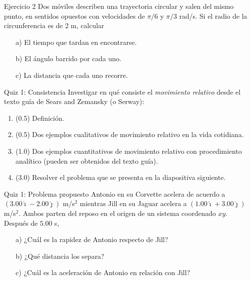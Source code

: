 \begin{frame}{Ejercicio 2}
    Dos móviles describen una trayectoria circular y salen del mismo punto, en sentidos opuestos con velocidades de $\pi/6$ y $\pi/3$ rad/s. Si el radio de la circunferencia es de 2 m, calcular
\begin{itemize}
    \item[a)] El tiempo que tardan en encontrarse.
    \item[b)] El ángulo barrido por cada uno.
    \item[c)] La distancia que cada uno recorre.
    \end{itemize}
\end{frame}

\begin{frame}{Quiz 1: Consistencia}
    Investigar en qué consiste el \textit{movimiento relativo} desde el texto guía de Sears and Zemansky (o Serway):

    \begin{enumerate}
        \item (0.5) Definición.
        \item (0.5) Dos ejemplos cualitativos de movimiento relativo en la vida cotidiana.
        \item (1.0) Dos ejemplos cuantitativos de movimiento relativo con procedimiento analítico (pueden ser obtenidos del texto guía).
        \item (3.0) Resolver el problema que se presenta en la diapositiva siguiente.
    \end{enumerate}
\end{frame}

\begin{frame}{Quiz 1: Problema propuesto}
    Antonio en su Corvette acelera de acuerdo a $(3.00\hat{\imath}-2.00\hat{\jmath})$ m/s$^2$ mientras Jill en su Jaguar acelera a $(1.00\hat{\imath}+3.00\hat{\jmath})$ m/s$^2$. Ambos parten del reposo en el origen de un sistema coordenado $xy$. Después de $5.00$ s,
	\begin{itemize}
	    \item[a)] ¿Cuál es la rapidez de Antonio respecto de Jill?
	    \item[b)] ¿Qué distancia los separa?
	    \item[c)] ¿Cuál es la aceleración de Antonio en relación con Jill?
	\end{itemize}
\end{frame}

